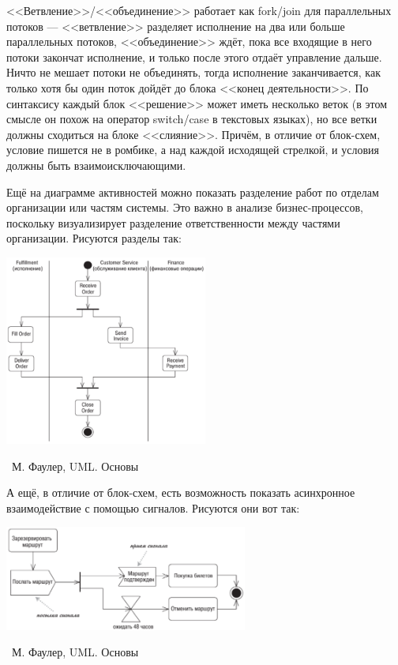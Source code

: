 \documentclass[a5paper]{article}
\newcommand{\attribution}[1] {
    \vspace{-4mm}\begin{flushright}\begin{scriptsize}%
    {\textcopyright\, #1}\end{scriptsize}\end{flushright}
}
\begin{document}
<<Ветвление>>/<<объединение>> работает как fork/join для параллельных потоков --- <<ветвление>> разделяет исполнение на два или больше параллельных потоков, <<объединение>> ждёт, пока все входящие в него потоки закончат исполнение, и только после этого отдаёт управление дальше. Ничто не мешает потоки не объединять, тогда исполнение заканчивается, как только хотя бы один поток дойдёт до блока <<конец деятельности>>. По синтаксису каждый блок <<решение>> может иметь несколько веток (в этом смысле он похож на оператор switch/case в текстовых языках), но все ветки должны сходиться на блоке <<слияние>>. Причём, в отличие от блок-схем, условие пишется не в ромбике, а над каждой исходящей стрелкой, и условия должны быть взаимоисключающими.

Ещё на диаграмме активностей можно показать разделение работ по отделам организации или частям системы. Это важно в анализе бизнес-процессов, поскольку визуализирует разделение ответственности между частями организации. Рисуются разделы так:

\begin{center}
    \includegraphics[width=0.5\textwidth]{activitySwimlanes.png}
    \attribution{М. Фаулер, UML. Основы}
\end{center}

А ещё, в отличие от блок-схем, есть возможность показать асинхронное взаимодействие с помощью сигналов. Рисуются они вот так:

\begin{center}
    \includegraphics[width=0.6\textwidth]{activitySignals.png}
    \attribution{М. Фаулер, UML. Основы}
\end{center}
\end{document}
